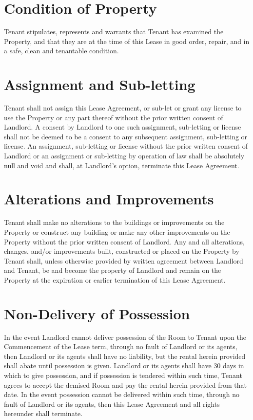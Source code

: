 \documentclass{amsart}
\begin{document}
\section{Condition of Property}
Tenant stipulates, represents and warrants that Tenant has examined the
Property, and that they are at the time of this Lease in good order, repair, and
in a safe, clean and tenantable condition.
\section{Assignment and Sub-letting}
Tenant shall not assign this Lease Agreement, or sub-let or grant any license to
use the Property or any part thereof without the prior written consent of
Landlord. A consent by Landlord to one such assignment, sub-letting or license
shall not be deemed to be a consent to any subsequent assignment, sub-letting or
license. An assignment, sub-letting or license without the prior written consent
of Landlord or an assignment or sub-letting by operation of law shall be
absolutely null and void and shall, at Landlord's option, terminate this Lease
Agreement.
\section{Alterations and Improvements}
Tenant shall make no alterations to the buildings or improvements on the
Property or construct any building or make any other improvements on the
Property without the prior written consent of Landlord. Any and all alterations,
changes, and/or improvements built, constructed or placed on the Property by
Tenant shall, unless otherwise provided by written agreement between Landlord
and Tenant, be and become the property of Landlord and remain on the Property at
the expiration or earlier termination of this Lease Agreement.
\section{Non-Delivery of Possession}
In the event Landlord cannot deliver possession of the Room to Tenant upon the
Commencement of the Lease term, through no fault of Landlord or its agents, then
Landlord or its agents shall have no liability, but the rental herein provided
shall abate until possession is given. Landlord or its agents shall have 30 days
in which to give possession, and if possession is tendered within such time,
Tenant agrees to accept the demised Room and pay the rental herein provided from
that date. In the event possession cannot be delivered within such time, through
no fault of Landlord or its agents, then this Lease Agreement and all rights
hereunder shall terminate.
\end{document}
